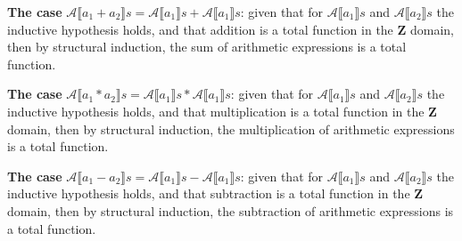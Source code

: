 \documentclass{article}
\begin{document}
\noindent \textbf{The case} $\mathcal{A}\llbracket a_1 + a_2 \rrbracket s = \mathcal{A}\llbracket a_1 \rrbracket s + \mathcal{A}\llbracket a_1 \rrbracket s$:
given that for $\mathcal{A}\llbracket a_1 \rrbracket s$ and $\mathcal{A}\llbracket a_2 \rrbracket s$ the inductive hypothesis holds, and that addition is a total function in the \textbf{Z} domain, then by structural induction, the sum of arithmetic expressions is a total function.

\noindent \textbf{The case} $\mathcal{A}\llbracket a_1 * a_2 \rrbracket s = \mathcal{A}\llbracket a_1 \rrbracket s * \mathcal{A}\llbracket a_1 \rrbracket s$:
given that for $\mathcal{A}\llbracket a_1 \rrbracket s$ and $\mathcal{A}\llbracket a_2 \rrbracket s$ the inductive hypothesis holds, and that multiplication is a total function in the \textbf{Z} domain, then by structural induction, the multiplication of arithmetic expressions is a total function.

\noindent \textbf{The case} $\mathcal{A}\llbracket a_1 - a_2 \rrbracket s = \mathcal{A}\llbracket a_1 \rrbracket s - \mathcal{A}\llbracket a_1 \rrbracket s$:
given that for $\mathcal{A}\llbracket a_1 \rrbracket s$ and $\mathcal{A}\llbracket a_2 \rrbracket s$ the inductive hypothesis holds, and that subtraction is a total function in the \textbf{Z} domain, then by structural induction, the subtraction of arithmetic expressions is a total function.
\end{document}
